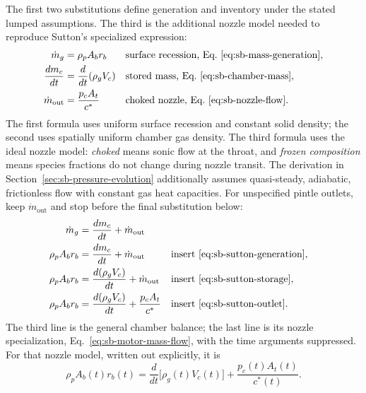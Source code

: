 The first two substitutions define generation and inventory under the
stated lumped assumptions. The third is the additional nozzle model
needed to reproduce Sutton's specialized expression:
\begin{align}
 \dot m_g&=\rho_p A_b r_b
 &&\text{surface recession, Eq.~\eqref{eq:sb-mass-generation}},
 \label{eq:sb-sutton-generation}\\
 \frac{dm_c}{dt}
 &=\frac{d}{dt}(\rho_gV_c)
 &&\text{stored mass, Eq.~\eqref{eq:sb-chamber-mass}},
 \label{eq:sb-sutton-storage}\\
 \dot m_{\mathrm{out}}&=\frac{p_c A_t}{c^*}
 &&\text{choked nozzle, Eq.~\eqref{eq:sb-nozzle-flow}}.
 \label{eq:sb-sutton-outlet}
\end{align}
The first formula uses uniform surface recession and constant solid
density; the second uses spatially uniform chamber gas density.
The third formula uses the ideal nozzle model: \emph{choked} means
sonic flow at the throat, and \emph{frozen composition} means species
fractions do not change during nozzle transit. The derivation in
Section~\ref{sec:sb-pressure-evolution} additionally assumes quasi-steady,
adiabatic, frictionless flow with constant gas heat capacities.
For unspecified pintle outlets, keep $\dot m_{\mathrm{out}}$ and stop
before the final substitution below:
\begin{align*}
 \dot m_g&=\frac{dm_c}{dt}+\dot m_{\mathrm{out}}\\
 \rho_p A_b r_b&=\frac{dm_c}{dt}+\dot m_{\mathrm{out}}
 &&\text{insert \eqref{eq:sb-sutton-generation}},\\
 \rho_p A_b r_b&=\frac{d(\rho_gV_c)}{dt}+\dot m_{\mathrm{out}}
 &&\text{insert \eqref{eq:sb-sutton-storage}},\\
 \rho_p A_b r_b&=\frac{d(\rho_gV_c)}{dt}+\frac{p_c A_t}{c^*}
 &&\text{insert \eqref{eq:sb-sutton-outlet}}.
\end{align*}
The third line is the general chamber balance; the last line is its
nozzle specialization, Eq.~\eqref{eq:sb-motor-mass-flow}, with the time
arguments suppressed. For that nozzle model, written out explicitly, it is
\[
 \rho_p A_b(t)r_b(t)
 =\frac{d}{dt}\bigl[\rho_g(t)V_c(t)\bigr]
  +\frac{p_c(t)A_t(t)}{c^*(t)}.
\]

